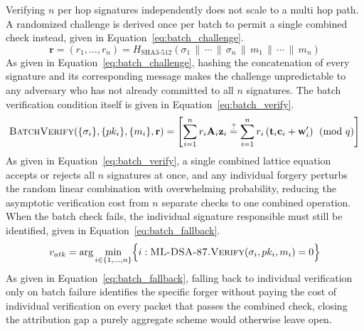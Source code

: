 \documentclass[final,5p,twocolumn]{elsarticle}
\theoremstyle{remark}
\theoremstyle{plain}
\begin{document}
Verifying $n$ per hop signatures independently does not scale to a multi hop
path. A randomized challenge is derived once per batch to permit a single
combined check instead, given in Equation~\eqref{eq:batch_challenge}.
\begin{equation}
	\mathbf{r} = (r_1, \ldots, r_n) = H_{\text{SHA3-512}}\!\left(\sigma_1 \,\|\, \cdots \,\|\, \sigma_n \,\|\, m_1 \,\|\, \cdots \,\|\, m_n\right)
	\label{eq:batch_challenge}
\end{equation}
As given in Equation~\eqref{eq:batch_challenge}, hashing the concatenation of
every signature and its corresponding message makes the challenge
unpredictable to any adversary who has not already committed to all $n$
signatures. The batch verification condition itself is given in
Equation~\eqref{eq:batch_verify}.
\begin{equation}
	\textsc{BatchVerify}\!\left(\{\sigma_i\}, \{pk_i\}, \{m_i\}, \mathbf{r}\right) = \left[\sum_{i=1}^{n} r_i \mathbf{A}_i \mathbf{z}_i \stackrel{?}{=} \sum_{i=1}^{n} r_i \left(\mathbf{t}_i \mathbf{c}_i + \mathbf{w}'_i\right) \pmod{q}\right]
	\label{eq:batch_verify}
\end{equation}
As given in Equation~\eqref{eq:batch_verify}, a single combined lattice
equation accepts or rejects all $n$ signatures at once, and any individual
forgery perturbs the random linear combination with overwhelming
probability, reducing the asymptotic verification cost from $n$ separate
checks to one combined operation. When the batch check fails, the
individual signature responsible must still be identified, given in
Equation~\eqref{eq:batch_fallback}.
\begin{equation}
	v_{atk} = \arg\min_{i \in \{1,\ldots,n\}} \Bigl\{i : \textsc{ML-DSA-87.Verify}(\sigma_i, pk_i, m_i) = 0\Bigr\}
	\label{eq:batch_fallback}
\end{equation}
As given in Equation~\eqref{eq:batch_fallback}, falling back to individual
verification only on batch failure identifies the specific forger without
paying the cost of individual verification on every packet that passes the
combined check, closing the attribution gap a purely aggregate scheme would
otherwise leave open.
\end{document}
